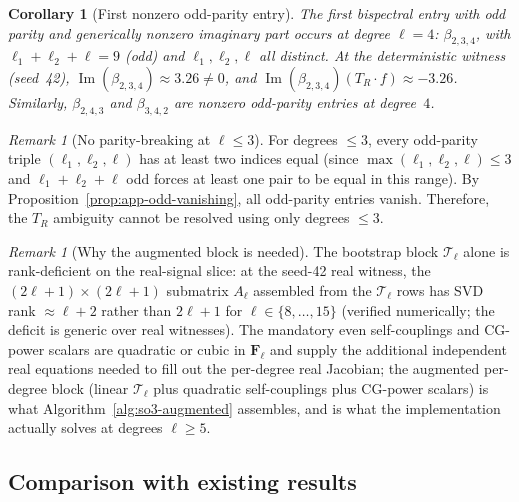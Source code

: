 \documentclass{article}
\newtheorem{corollary}[theorem]{Corollary}
\theoremstyle{definition}
\theoremstyle{remark}
\newtheorem{remark}[theorem]{Remark}
\DeclareMathOperator{\im}{Im}
\theoremstyle{definition}
\begin{document}
\begin{corollary}[First nonzero odd-parity entry]\label{cor:app-first-odd}
The first bispectral entry with odd parity and generically nonzero imaginary
part occurs at degree $\ell = 4$:
$\beta_{2,3,4}$, with
$\ell_1+\ell_2+\ell = 9$ (odd) and
$\ell_1, \ell_2, \ell$ all distinct.
At the deterministic witness (seed~42), $\im(\beta_{2,3,4}) \approx 3.26 \ne 0$,
and $\im(\beta_{2,3,4})(T_R \cdot f) \approx -3.26$.
Similarly, $\beta_{2,4,3}$ and $\beta_{3,4,2}$ are nonzero odd-parity entries
at degree~$4$.
\end{corollary}

\begin{remark}[No parity-breaking at $\ell \le 3$]\label{rem:app-no-parity-breaking-le3}
For degrees $\le 3$, every odd-parity triple $(\ell_1,\ell_2,\ell)$
has at least two indices equal (since $\max(\ell_1,\ell_2,\ell) \le 3$
and $\ell_1+\ell_2+\ell$ odd forces at least one pair to be equal in this range).
By Proposition~\ref{prop:app-odd-vanishing}, all odd-parity entries vanish.
Therefore, the $T_R$ ambiguity cannot be resolved using only degrees $\le 3$.
\end{remark}

\begin{remark}[Why the augmented block is needed]
\label{rem:app-Tell-rank-deficit}
The bootstrap block $\mathcal{T}_\ell$ alone is rank-deficient on the
real-signal slice: at the seed-42 real witness, the
$(2\ell{+}1)\times(2\ell{+}1)$ submatrix $A_\ell$ assembled from the
$\mathcal{T}_\ell$ rows has SVD rank
$\approx \ell{+}2$ rather than $2\ell{+}1$ for $\ell\in\{8,\dots,15\}$
(verified numerically; the deficit is generic over real witnesses).
The mandatory even self-couplings and CG-power scalars are quadratic
or cubic in $\mathbf{F}_\ell$ and supply the additional independent
real equations needed to fill out the per-degree real Jacobian; the
augmented per-degree block (linear $\mathcal{T}_\ell$ plus quadratic
self-couplings plus CG-power scalars) is what
Algorithm~\ref{alg:so3-augmented} assembles, and is what the
implementation actually solves at degrees $\ell\ge 5$.
\end{remark}

\subsection{Comparison with existing results}
\label{sec:app-comparison}
\end{document}
